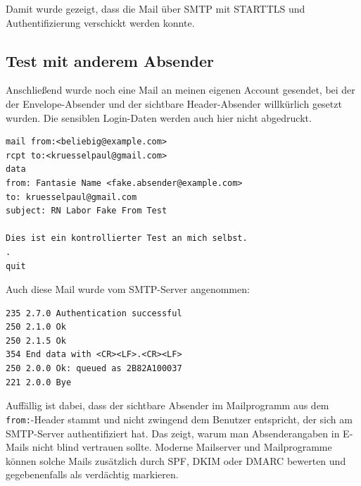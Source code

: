 \documentclass{kdiartcl}
\begin{document}
Damit wurde gezeigt, dass die Mail über SMTP mit STARTTLS und Authentifizierung verschickt werden konnte.

\subsection{Test mit anderem Absender}

Anschließend wurde noch eine Mail an meinen eigenen Account gesendet, bei der der Envelope-Absender und der sichtbare Header-Absender willkürlich gesetzt wurden. Die sensiblen Login-Daten werden auch hier nicht abgedruckt.

\begin{verbatim}
mail from:<beliebig@example.com>
rcpt to:<kruesselpaul@gmail.com>
data
from: Fantasie Name <fake.absender@example.com>
to: kruesselpaul@gmail.com
subject: RN Labor Fake From Test

Dies ist ein kontrollierter Test an mich selbst.
.
quit
\end{verbatim}

Auch diese Mail wurde vom SMTP-Server angenommen:

\begin{verbatim}
235 2.7.0 Authentication successful
250 2.1.0 Ok
250 2.1.5 Ok
354 End data with <CR><LF>.<CR><LF>
250 2.0.0 Ok: queued as 2B82A100037
221 2.0.0 Bye
\end{verbatim}

Auffällig ist dabei, dass der sichtbare Absender im Mailprogramm aus dem \texttt{from:}-Header stammt und nicht zwingend dem Benutzer entspricht, der sich am SMTP-Server authentifiziert hat. Das zeigt, warum man Absenderangaben in E-Mails nicht blind vertrauen sollte. Moderne Mailserver und Mailprogramme können solche Mails zusätzlich durch SPF, DKIM oder DMARC bewerten und gegebenenfalls als verdächtig markieren.
\end{document}
